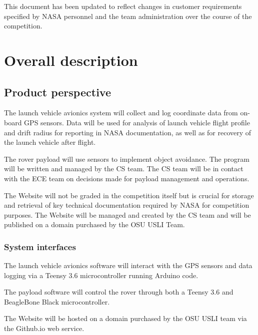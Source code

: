\documentclass[onecolumn, draftclsnofoot, 10pt, compsoc]{IEEEtran}
\begin{document}
This document has been updated to reflect changes in customer requirements specified by NASA personnel and the team administration over the course of the competition.


\section{Overall description}
\subsection{Product perspective}
The launch vehicle avionics system will collect and log coordinate data from on-board GPS sensors. Data will be used for analysis of launch vehicle flight profile and drift radius for reporting in NASA documentation, as well as for recovery of the launch vehicle after flight.

The rover payload will use sensors to implement object avoidance. The program will be written and managed by the CS team. The CS team will be in contact with the ECE team on decisions made for payload management and operations. 

The Website will not be graded in the competition itself but is crucial for storage and retrieval of key technical documentation required by NASA for competition purposes. The Website will be managed and created by the CS team and will be published on a domain purchased by the OSU USLI Team. 

\subsubsection{System interfaces}
The launch vehicle avionics software will interact with the GPS sensors and data logging via a Teensy 3.6 microcontroller running Arduino code. 

\noindent The payload software will control the rover through both a Teensy 3.6 and BeagleBone Black microcontroller.

\noindent The Website will be hosted on a domain purchased by the OSU USLI team via the Github.io web service.
\end{document}
